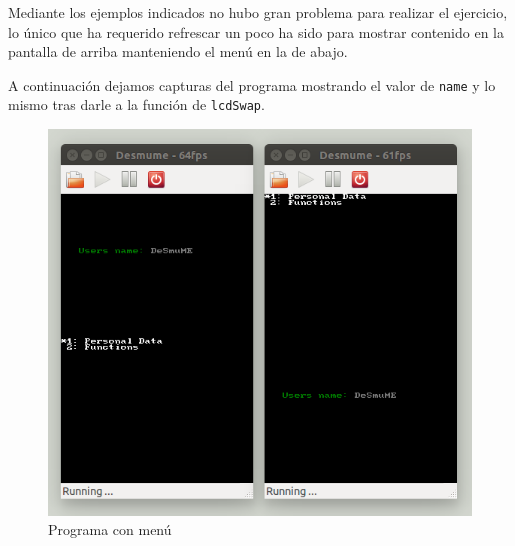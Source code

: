 Mediante los ejemplos indicados no hubo gran problema para realizar el ejercicio, lo único que ha requerido refrescar un poco ha sido para mostrar contenido en la pantalla de arriba manteniendo el menú en la de abajo.

A continuación dejamos capturas del programa mostrando el valor de {\tt name} y lo mismo tras darle a la función de {\tt lcdSwap}.

\begin{figure}[H] 
\centering
\includegraphics[scale=0.35]{P2Media/prog.png}
\caption{Programa con menú}
\end{figure}
